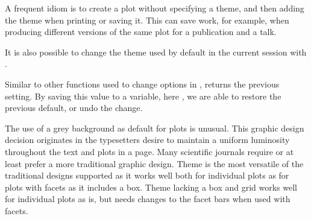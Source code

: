 \documentclass[krantz2]{krantz}\usepackage{knitr}
\begin{document}
A frequent idiom is to create a plot without specifying a theme, and then adding the theme when printing or saving it. This can save work, for example, when producing different versions of the same plot for a publication and a talk.

\begin{knitrout}\footnotesize
{}\color{fgcolor}\begin{kframe}
\begin{alltt}
 \hlkwb{<-}   \hlopt{+}
       \hlstd{()}
 \hlopt{+} \hlstd{())}
\end{alltt}
\end{kframe}
\end{knitrout}

It is also possible to change the theme used by default in the current \Rlang session with .

\begin{knitrout}\footnotesize
{}\color{fgcolor}\begin{kframe}
\begin{alltt}
 \hlkwb{<-} \hlstd{(}\hlstd{(}\hlstd{))}
\end{alltt}
\end{kframe}
\end{knitrout}

Similar to other functions used to change options in \Rlang,  returns the previous setting. By saving this value to a variable, here , we are able to restore the previous default, or undo the change.

\begin{knitrout}\footnotesize
{}\color{fgcolor}\begin{kframe}
\begin{alltt}
\end{alltt}
\end{kframe}
\end{knitrout}

\begin{explainbox}
The use of a grey background as default for plots is unusual. This graphic design decision originates in the typesetters desire to maintain a uniform luminosity throughout the text and plots in a page. Many scientific journals require or at least prefer a more traditional graphic design. Theme  is the most versatile of the traditional designs supported as it works well both for individual plots as for plots with facets as it includes a box. Theme  lacking a box and grid works well for individual plots as is, but needs changes to the facet bars when used with facets.
\end{explainbox}
\end{document}

